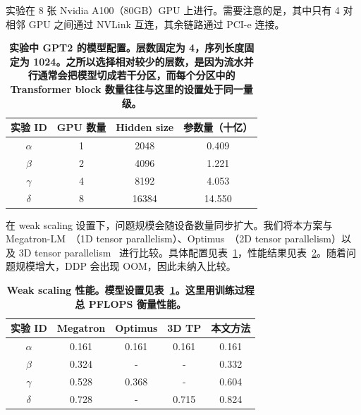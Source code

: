 \documentclass[10pt,letterpaper,twocolumn]{article}
\begin{document}
实验在 8 张 Nvidia A100（80GB）GPU 上进行。需要注意的是，其中只有 4 对相邻 GPU 之间通过 NVLink 互连，其余链路通过 PCI-e 连接。

\begin{table}[h]
    \centering
    \begin{tabular}{|c|c|c|c|}
        \hline
        实验 ID & GPU 数量 & Hidden size & 参数量（十亿）\\
        \hline
        $\alpha$ & 1 & 2048 & 0.409\\
        \hline
        $\beta$ & 2 & 4096 & 1.221\\
        \hline
        $\gamma$ & 4 & 8192 & 4.053\\
        \hline
        $\delta$ & 8 & 16384 & 14.550\\
        \hline
    \end{tabular}
    \caption{\textbf{实验中 GPT2 的模型配置。层数固定为 4，序列长度固定为 1024。之所以选择相对较少的层数，是因为流水并行通常会把模型切成若干分区，而每个分区中的 Transformer block 数量往往与这里的设置处于同一量级。}}
    \label{tab:experiment setting}
    \vspace{-1.9em}
\end{table}

在 weak scaling 设置下，问题规模会随设备数量同步扩大。我们将本方案与 Megatron-LM~\cite{shoeybi2019megatron}（1D tensor parallelism）、Optimus~\cite{https://doi.org/10.48550/arxiv.2104.05343}（2D tensor parallelism）以及 3D tensor parallelism~\cite{https://doi.org/10.48550/arxiv.2105.14450} 进行比较。具体配置见表~\ref{tab:experiment setting}，性能结果见表~\ref{tab: experiment performance}。随着问题规模增大，DDP 会出现 OOM，因此未纳入比较。

\begin{table}[h]
    \centering
    \begin{tabular}{|c|c|c|c|c|}
        \hline
        实验 ID & Megatron & Optimus & 3D TP & 本文方法\\
        \hline
        $\alpha$ & 0.161 & 0.161 & 0.161 & 0.161\\
        \hline
        $\beta$ & 0.324 & - & - & 0.332\\
        \hline
        $\gamma$ & 0.528 & 0.368 & - & 0.604\\
        \hline
        $\delta$ & 0.728 & - & 0.715 & 0.824\\
        \hline
    \end{tabular}
    \caption{\textbf{Weak scaling 性能。模型设置见表~\ref{tab:experiment setting}。这里用训练过程总 PFLOPS 衡量性能。}}
    \label{tab: experiment performance}
    \vspace{-2em}
\end{table}
\end{document}
